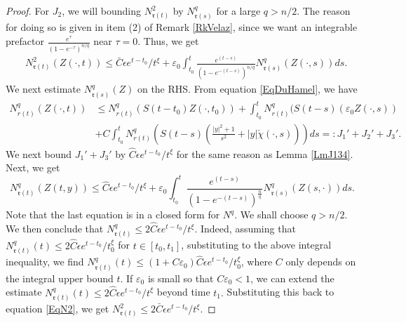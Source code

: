 \documentclass[11pt]{amsart}
\numberwithin{equation}{section}
\numberwithin{equation}{section}
\newcommand{\eps}{\varepsilon}
\newcommand{\mtr}{\mathfrak{r}}
\begin{document}
\begin{proof}
		
		For $J_2$, we will bounding $N_{\mtr(t)}^2$ by $N_{\mtr(s)}^{q}$ for a large $q>n/2$. The reason for doing so is given in item (2) of Remark \ref{RkVelaz}, since we want an integrable prefactor $\frac{e^{\tau}}{(1-e^{-\tau})^{n/q }}$ near $\tau=0$. 
		Thus, we get 
		\begin{equation}\label{EqN2}
			\begin{aligned}
				&N_{\mtr(t)}^2(Z(\cdot,t))\leq \bar C\epsilon e^{t-t_0}/t^\xi+ \eps_0\int_{t_0}^{t}  \frac{e^{(t-s)}}{(1-e^{-(t-s)})^{n/q }} N^{q}_{\mtr(s)}(Z(\cdot,s))ds.   
			\end{aligned}
		\end{equation}
		We next estimate $N^{q}_{\mtr(s)}(Z)$ on the RHS. From equation \eqref{EqDuHamel}, we have 
		\begin{equation*}
			\begin{aligned}
				N_{r(t)}^{q}(Z(\cdot,t))&\leq  N_{r(t)}^{q}(S(t-t_0)Z(\cdot,t_0))+\int_{t_0}^t N_{r(t)}^{q}(S(t-s)(\eps_0Z(\cdot,s))\\
				&+C\int_{t_0}^tN_{r(t)}^{q}\left(S(t-s)\left(\frac{|y|^2+1}{s^2}+|y|\check\chi(\cdot,s)\right)\right)ds=:J_1'+J_2'+J_3'.
				& \end{aligned}   
		\end{equation*}
		We next bound $J_1'+J_3'$ by $\hat C\epsilon e^{t-t_0}/t^\xi$ for the same reason as Lemma \ref{LmJ134}. Next, we get
		$$N_{\mtr(t)}^{q}(Z(t,y))\leq \hat C\epsilon e^{t-t_0}/t^\xi+\eps_0 \int_{t_0}^t\frac{e^{(t-s)}}{(1-e^{-(t-s)})^{\frac{n}{q}}} N^{q}_{\mtr(s)}(Z(s,\cdot))ds.$$
		Note that the last equation is in a closed form for $N^{q}$. We shall choose $q>n/2.$ We then conclude that $N_{\mtr(t)}^{q}\leq 2\hat C\epsilon e^{t-t_0}/t^\xi$. Indeed, assuming that $N_{\mtr(t)}^{q}(t)\leq 2\hat C\epsilon e^{t-t_0}/t_0^\xi$ for $t\in [t_0,t_1]$, substituting to the above integral inequality, we find $N_{\mtr(t)}^{q}(t)\leq (1+C\eps_0)\hat C\epsilon e^{t-t_0}/t_0^\xi$, where $C$ only depends on the integral upper bound $t$. If $\eps_0$ is small so that $C\eps_0<1$, we can extend the estimate $N_{\mtr(t)}^{q}(t)\leq 2\hat C\epsilon e^{t-t_0}/t^\xi$ beyond time $t_1.$
		Substituting this back to equation \eqref{EqN2}, we get $N_{\mtr(t)}^2\leq 2\bar C\epsilon e^{t-t_0}/t^\xi.$ 
		
		
		
	\end{proof}
	
\end{document}
